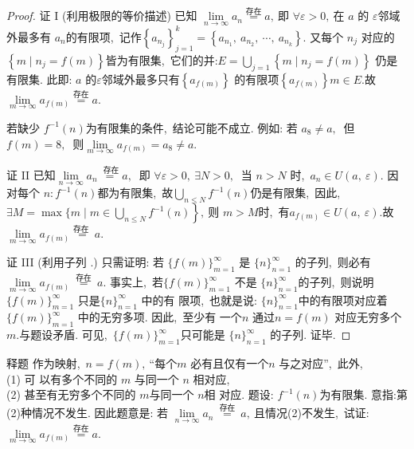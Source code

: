 \begin{proof}
	证 I (利用极限的等价描述) 已知  $\lim\limits_{n \rightarrow \infty} a_{n} \stackrel{\text {存在}}{=} a ,\  $即  $\forall \varepsilon>0 ,\  $在  $a$  的 $ \varepsilon  $邻域外最多有  $a_{n}  $的有限项,\  记作$  \left\{a_{n_{j}}\right\}_{j=1}^{k}=\left\{a_{n_{1}},\  a_{n_{2}},\  \cdots,\  a_{n_{k}}\right\} .$
	又每个  $n_{j} $ 对应的  $\left\{m \mid n_{j}=f(m)\right\}  $皆为有限集,\  它们的并:$ E=\bigcup\limits_{j=1}\left\{m \mid n_{j}=f(m)\right\} $
	仍是有限集. 此即:  $a$  的$  \varepsilon  $邻域外最多只有$  \left\{a_{f(m)}\right\} $ 的有限项$  \left\{a_{f(m)}\right\} m \in E . $故$ \lim\limits_{m \rightarrow \infty} a_{f(m)} \stackrel{\text {存在}}{=} a .$
	\begin{note}
		若缺少 $ f^{-1}(n)  $为有限集的条件,\  结论可能不成立. 例如: 若 $ a_{8} \neq a ,\ $ 但  $f(m)=8 ,\ $ 则$  \lim\limits_{m \rightarrow \infty} a_{f(m)}=a_{8} \neq a .$
	\end{note}
	证 II 已知$  \lim\limits_{n \rightarrow \infty} a_{n} \stackrel{\text { 存在}}{=} a ,\ $ 即  $\forall \varepsilon>0,\  \exists N>0 ,\ $ 当 $ n>N$  时,\ $ a_{n} \in U(a,\  \varepsilon) .$
	因对每个 $ n: f^{-1}(n)  $都为有限集,\  故$  \bigcup\limits_{n \leqslant N} f^{-1}(n)  $仍是有限集,\  因此,\  $ \exists M=\max \{m \mid   \left.m \in \bigcup_{n \leqslant N} f^{-1}(n)\right\} ,\  $则 $ m>M  $时,\ $ 有  a_{f(m)} \in U(a,\  \varepsilon) . $故$ \lim\limits_{m \rightarrow \infty} a_{f(m)} \stackrel{\text {存在 }}{=} a .$ 
	
	证 III (利用子列 .) 只需证明: 若  $\{f(m)\}_{m=1}^{\infty} $ 是  $\{n\}_{n=1}^{\infty} $ 的子列,\  则必有 $\lim\limits_{m \rightarrow \infty} a_{f(m)}   \stackrel{\text { 存在 }}{=} a .$
	事实上,\  若$  \{f(m)\}_{m=1}^{\infty} $ 不是  $\{n\}_{n=1}^{\infty}  $的子列,\  则说明$  \{f(m)\}_{m=1}^{\infty} $ 只是$  \{n\}_{n=1}^{\infty} $ 中的有 限项,\  也就是说:  $\{n\}_{n=1}^{\infty}  $中的有限项对应着$  \{f(m)\}_{m=1}^{\infty} $ 中的无穷多项. 因此,\  至少有 一个$  n$  通过$  n=f(m) $ 对应无穷多个 $ m . $与题设矛盾. 可见,\ $  \{f(m)\}_{m=1}^{\infty}  $只可能是  $\{n\}_{n=1}^{\infty}$  的子列. 证毕.
\end{proof}
\begin{note}
	释题 作为映射,\  $ n=f(m) ,\  $“每个$  m $ 必有且仅有一个$  n $ 与之对应”,\  此外,\  \\
	(1) 可 以有多个不同的 $ m $ 与同一个 $ n $ 相对应,\  \\
	(2) 甚至有无穷多个不同的 $ m  $与同一个  $n  $相 对应.
	题设: $ f^{-1}(n)  $为有限集. 意指:第(2)种情况不发生. 因此题意是: 若 $ \lim\limits_{n \rightarrow \infty} a_{n} \stackrel{\text { 存在 }}{=} a ,\  $且情况(2)不发生,\  试证:  $\lim\limits_{m \rightarrow \infty} a_{f(m)} \stackrel{\text {存在}}{=} a .$
\end{note}
